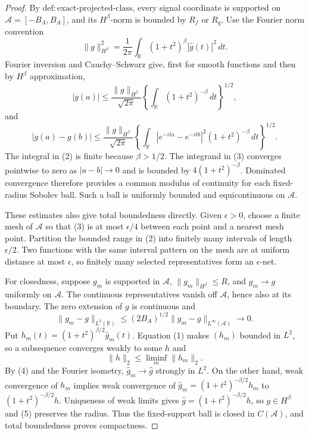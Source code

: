 \documentclass{article}
\begin{document}
\begin{proof}
By \(\mathrm{def{:}exact\text{-}projected\text{-}class}\), every signal
coordinate is supported on \(\mathcal A=[-B_A,B_A]\), and its
\(H^\beta\)-norm is bounded by \(R_f\) or \(R_q\).  Use the Fourier norm
convention
\[
 \|g\|_{H^\beta}^2
 =\frac1{2\pi}\int_{\mathbb R}(1+t^2)^\beta|\widehat g(t)|^2\,dt.\tag{1}
\]
Fourier inversion and Cauchy--Schwarz give, first for smooth functions and
then by \(H^\beta\) approximation,
\[
 |g(a)|\le\frac{\|g\|_{H^\beta}}{\sqrt{2\pi}}
 \left\{\int_{\mathbb R}(1+t^2)^{-\beta}\,dt\right\}^{1/2},     \tag{2}
\]
and
\[
 |g(a)-g(b)|\le\frac{\|g\|_{H^\beta}}{\sqrt{2\pi}}
 \left\{\int_{\mathbb R}|e^{-ita}-e^{-itb}|^2
 (1+t^2)^{-\beta}\,dt\right\}^{1/2}.                            \tag{3}
\]
The integral in (2) is finite because \(\beta>1/2\).  The integrand in (3)
converges pointwise to zero as \(|a-b|\to0\) and is bounded by
\(4(1+t^2)^{-\beta}\).  Dominated convergence therefore provides a common
modulus of continuity for each fixed-radius Sobolev ball.  Such a ball is
uniformly bounded and equicontinuous on \(\mathcal A\).

These estimates also give total boundedness directly.  Given
\(\epsilon>0\), choose a finite mesh of \(\mathcal A\) so that (3) is at
most \(\epsilon/4\) between each point and a nearest mesh point.  Partition
the bounded range in (2) into finitely many intervals of length
\(\epsilon/2\).  Two functions with the same interval pattern on the mesh
are at uniform distance at most \(\epsilon\), so finitely many selected
representatives form an \(\epsilon\)-net.

For closedness, suppose \(g_m\) is supported in \(\mathcal A\),
\(\|g_m\|_{H^\beta}\le R\), and \(g_m\to g\) uniformly on \(\mathcal A\).
The continuous representatives vanish off \(\mathcal A\), hence also at its
boundary.  The zero extension of \(g\) is continuous and
\[
 \|g_m-g\|_{L^2(\mathbb R)}
 \le(2B_A)^{1/2}\|g_m-g\|_{L^\infty(\mathcal A)}\longrightarrow0.\tag{4}
\]
Put \(h_m(t)=(1+t^2)^{\beta/2}\widehat g_m(t)\).  Equation (1) makes
\((h_m)\) bounded in \(L^2\), so a subsequence converges weakly to some
\(h\) and
\[
 \|h\|_2\le\liminf_m\|h_m\|_2.                                  \tag{5}
\]
By (4) and the Fourier isometry,
\(\widehat g_m\to\widehat g\) strongly in \(L^2\).  On the other hand,
weak convergence of \(h_m\) implies weak convergence of
\(\widehat g_m=(1+t^2)^{-\beta/2}h_m\) to
\((1+t^2)^{-\beta/2}h\).  Uniqueness of weak limits gives
\(\widehat g=(1+t^2)^{-\beta/2}h\), so \(g\in H^\beta\) and (5) preserves
the radius.  Thus the fixed-support ball is closed in \(C(\mathcal A)\), and
total boundedness proves compactness.


\end{proof}
\end{document}
